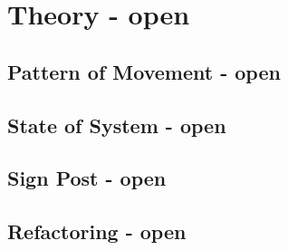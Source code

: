 \part{Theory - open}
\chapter{Pattern of Movement - open}
\chapter{State of System - open}
\chapter{Sign Post - open}
\chapter{Refactoring - open}
